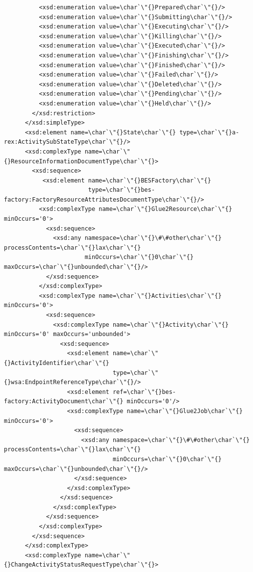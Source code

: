 \documentclass{article}                            %
\begin{document}
\begin{footnotesize}
\begin{verbatim}
          <xsd:enumeration value=\char`\"{}Prepared\char`\"{}/>
          <xsd:enumeration value=\char`\"{}Submitting\char`\"{}/>
          <xsd:enumeration value=\char`\"{}Executing\char`\"{}/>
          <xsd:enumeration value=\char`\"{}Killing\char`\"{}/>
          <xsd:enumeration value=\char`\"{}Executed\char`\"{}/>
          <xsd:enumeration value=\char`\"{}Finishing\char`\"{}/>
          <xsd:enumeration value=\char`\"{}Finished\char`\"{}/>
          <xsd:enumeration value=\char`\"{}Failed\char`\"{}/>
          <xsd:enumeration value=\char`\"{}Deleted\char`\"{}/>
          <xsd:enumeration value=\char`\"{}Pending\char`\"{}/>
          <xsd:enumeration value=\char`\"{}Held\char`\"{}/>
        </xsd:restriction>
      </xsd:simpleType>
      <xsd:element name=\char`\"{}State\char`\"{} type=\char`\"{}a-rex:ActivitySubStateType\char`\"{}/>
      <xsd:complexType name=\char`\"{}ResourceInformationDocumentType\char`\"{}>
        <xsd:sequence>
           <xsd:element name=\char`\"{}BESFactory\char`\"{}
                        type=\char`\"{}bes-factory:FactoryResourceAttributesDocumentType\char`\"{}/>
          <xsd:complexType name=\char`\"{}Glue2Resource\char`\"{} minOccurs='0'>
            <xsd:sequence>
              <xsd:any namespace=\char`\"{}\#\#other\char`\"{} processContents=\char`\"{}lax\char`\"{}
                       minOccurs=\char`\"{}0\char`\"{} maxOccurs=\char`\"{}unbounded\char`\"{}/>
            </xsd:sequence>
          </xsd:complexType>
          <xsd:complexType name=\char`\"{}Activities\char`\"{} minOccurs='0'>
            <xsd:sequence>
              <xsd:complexType name=\char`\"{}Activity\char`\"{} minOccurs='0' maxOccurs='unbounded'>
                <xsd:sequence>
                  <xsd:element name=\char`\"{}ActivityIdentifier\char`\"{}
                               type=\char`\"{}wsa:EndpointReferenceType\char`\"{}/>
                  <xsd:element ref=\char`\"{}bes-factory:ActivityDocument\char`\"{} minOccurs='0'/>
                  <xsd:complexType name=\char`\"{}Glue2Job\char`\"{} minOccurs='0'>
                    <xsd:sequence>
                      <xsd:any namespace=\char`\"{}\#\#other\char`\"{} processContents=\char`\"{}lax\char`\"{}
                               minOccurs=\char`\"{}0\char`\"{} maxOccurs=\char`\"{}unbounded\char`\"{}/>
                    </xsd:sequence>
                  </xsd:complexType>
                </xsd:sequence>
              </xsd:complexType>
            </xsd:sequence>
          </xsd:complexType>
        </xsd:sequence>
      </xsd:complexType>
      <xsd:complexType name=\char`\"{}ChangeActivityStatusRequestType\char`\"{}>

\end{verbatim}
\end{footnotesize}
\end{document}
